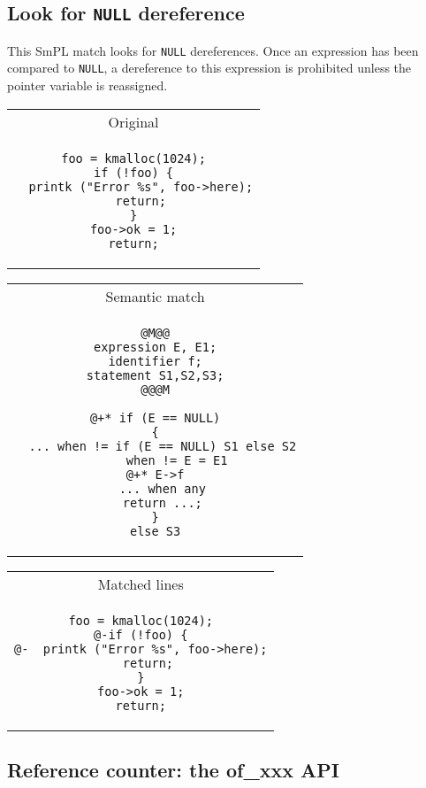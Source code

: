 \newpage
\subsection{Look for \texttt{NULL} dereference}

This SmPL match looks for \texttt{NULL} dereferences. Once an
expression has been compared to \texttt{NULL}, a dereference to this
expression is prohibited unless the pointer variable is reassigned.\\

\begin{tabular}{c}
    Original \\

\begin{lstlisting}
foo = kmalloc(1024);
if (!foo) {
  printk ("Error %s", foo->here);
  return;
}
foo->ok = 1;
return;
\end{lstlisting}\\
  \end{tabular}

\vspace{1cm}

\begin{tabular}{c}
  Semantic match\\

\begin{lstlisting}[language=Cocci]
@M@@
expression E, E1;
identifier f;
statement S1,S2,S3;
@@@M

@+* if (E == NULL)
{
  ... when != if (E == NULL) S1 else S2
      when != E = E1
@+* E->f
  ... when any
  return ...;
}
else S3
\end{lstlisting}\\
\end{tabular}

\vspace{1cm}

\begin{tabular}{c}
  Matched lines\\

\begin{lstlisting}[language=PatchC]
foo = kmalloc(1024);
@-if (!foo) {
@-  printk ("Error %s", foo->here);
  return;
}
foo->ok = 1;
return;
\end{lstlisting}\\
\end{tabular}

\newpage
\subsection{Reference counter: the of\_xxx API}

